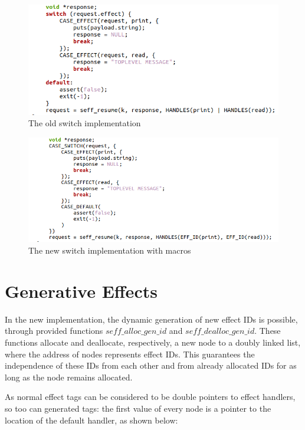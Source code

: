 \documentclass[logo,bsc,singlespacing,parskip,online]{infthesis}
\begin{document}
\begin{figure}[ht]
    \centering
    \includegraphics[width=1\linewidth]{oldswitch.png}
    \caption{The old switch implementation}
    \label{fig:oldswitch}
\end{figure}

\begin{figure}[ht]
    \centering
    \includegraphics[width=1\linewidth]{newswitch.png}
    \caption{The new switch implementation with macros}
    \label{fig:newswitch}
\end{figure}

\section{Generative Effects}

In the new implementation, the dynamic generation of new effect IDs is possible, through provided functions $seff\_alloc\_gen\_id$ and $seff\_dealloc\_gen\_id$. These functions allocate and deallocate, respectively, a new node to a doubly linked list, where the address of nodes represents effect IDs. This guarantees the independence of these IDs from each other and from already allocated IDs for as long as the node remains allocated.

As normal effect tags can be considered to be double pointers to effect handlers, so too can generated tags: the first value of every node is a pointer to the location of the default handler, as shown below:\todo
\end{document}
